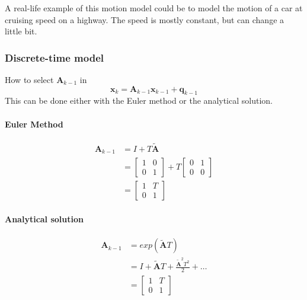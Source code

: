 A real-life example of this motion model could be to model the motion of a car at cruising speed on a highway. The speed is mostly constant, but can change a little bit.

\subsubsection{Discrete-time model}
How to select $\mathbf{A}_{k-1}$ in
\begin{equation}
    \mathbf{x}_k = \mathbf{A}_{k-1} \mathbf{x}_{k-1} + \mathbf{q}_{k-1}
\end{equation}
This can be done either with the Euler method or the analytical solution.
\paragraph{Euler Method}
\begin{align}
    \mathbf{A}_{k-1} & = I + T \mathbf{\tilde{A}} \\
              &= \left[\begin{array}{cc}
                  1 & 0 \\
                  0 & 1
              \end{array}\right] + T \left[\begin{array}{cc}
                  0 & 1 \\
                  0 & 0
              \end{array}\right] \\
              &= \left[\begin{array}{cc}
                  1 & T \\
                  0 & 1
              \end{array}\right]
\end{align}

\paragraph{Analytical solution}
\begin{align}
    \mathbf{A}_{k-1} & = exp(\mathbf{\tilde{A}}T) \\
    & = I + \mathbf{\tilde{A}}T + \frac{\mathbf{\tilde{A}}^2T^2}{2} + \dots \\
    & = \left[\begin{array}{cc}
        1 & T \\
        0 & 1
    \end{array}\right]
\end{align}

